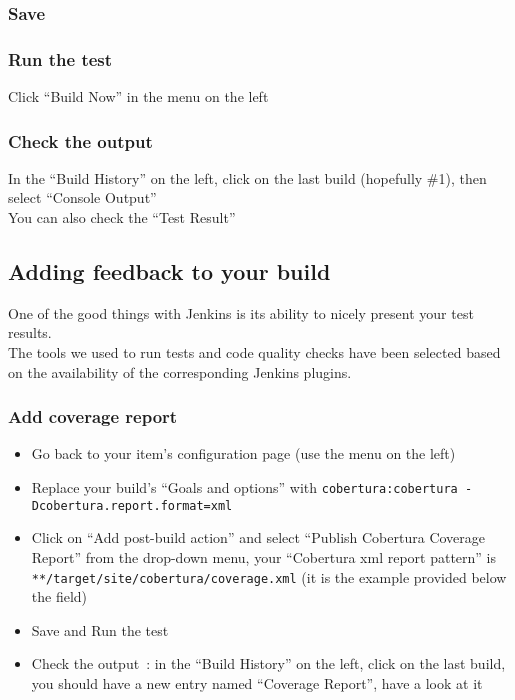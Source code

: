 \documentclass{article}
\begin{document}
\subsubsection{Save}

\subsubsection{Run the test}
Click ``Build Now'' in the menu on the left

\subsubsection{Check the output}
In the ``Build History'' on the left, click on the last build (hopefully \#1), then select ``Console Output'' \\
You can also check the ``Test Result''

\subsection{Adding feedback to your build}
One of the good things with Jenkins is its ability to nicely present your test results. \\
The tools we used to run tests and code quality checks have been selected based on the availability of the corresponding Jenkins plugins.

\subsubsection{Add coverage report}
\begin{itemize}
\item Go back to your item's configuration page (use the menu on the left)
\item Replace your build's ``Goals and options'' with \texttt{cobertura:cobertura -Dcobertura.report.format=xml}
\item Click on ``Add post-build action'' and select ``Publish Cobertura Coverage Report'' from the drop-down menu, your ``Cobertura xml report pattern'' is \texttt{**/target/site/cobertura/coverage.xml} (it is the example provided below the field)
\item Save and Run the test
\item Check the output~: in the ``Build History'' on the left, click on the last build, you should have a new entry named ``Coverage Report'', have a look at it
\end{itemize}
\end{document}
